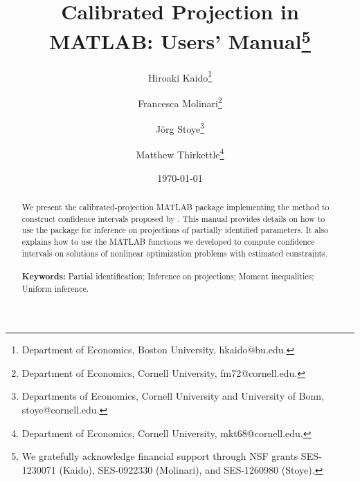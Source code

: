 \documentclass[12pt]{article}
\begin{document}
\begin{titlepage}
\title{Calibrated Projection in MATLAB: Users' Manual\thanks{We gratefully acknowledge financial support through NSF grants SES-1230071 (Kaido), SES-0922330 (Molinari), and SES-1260980 (Stoye).}}
\author{\normalsize{Hiroaki Kaido}\thanks{Department of Economics, Boston University, hkaido@bu.edu.} \and
            \normalsize{Francesca Molinari}\thanks{Department of Economics, Cornell University, fm72@cornell.edu.} \and
            \normalsize{J\"org Stoye}\thanks{ Departments of Economics, Cornell University and University of Bonn, stoye@cornell.edu.} \and
            \normalsize{Matthew Thirkettle}\thanks{Department of Economics, Cornell University, mkt68@cornell.edu.}}
\date{\normalsize{\today}}
\maketitle
\begin{abstract}
\noindent We present the calibrated-projection MATLAB package implementing the method to construct confidence intervals proposed by .  This manual provides details on how to use the package for inference on projections of partially identified parameters.  It also explains how to use the MATLAB functions we developed to compute confidence intervals on solutions of nonlinear optimization problems with estimated constraints. \\
\vspace{0in}\\
\noindent\textbf{Keywords:}  Partial identification; Inference on projections; Moment inequalities; Uniform inference.\\
\bigskip
\end{abstract}
\setcounter{page}{0}
\thispagestyle{empty}
\end{titlepage}
\pagebreak \newpage




\doublespacing
\end{document}
